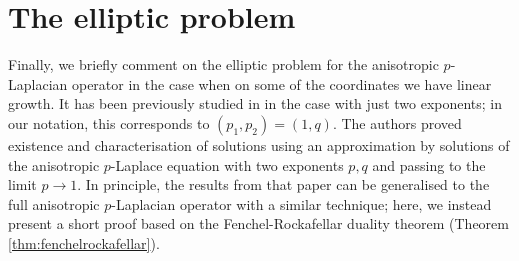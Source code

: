\documentclass[reqno,12pt]{amsart}
\numberwithin{equation}{section}
\begin{document}
\section{The elliptic problem}\label{sec:elliptic}

Finally, we briefly comment on the elliptic problem for the anisotropic $p$-Laplacian operator in the case when on some of the coordinates we have linear growth. It has been previously studied in \cite{MRST} in the case with just two exponents; in our notation, this corresponds to $(p_1,p_2) = (1,q)$. The authors proved existence and characterisation of solutions using an approximation by solutions of the anisotropic $p$-Laplace equation with two exponents $p,q$ and passing to the limit $p \rightarrow 1$. In principle, the results from that paper can be generalised to the full anisotropic $p$-Laplacian operator with a similar technique; here, we instead present a short proof based on the Fenchel-Rockafellar duality theorem (Theorem \ref{thm:fenchelrockafellar}).
\end{document}
